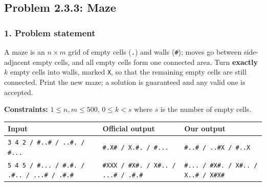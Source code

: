 \subsection{Problem 2.3.3: Maze}


\newcommand{\gtpz}[4]{\node[#3] at (#2*0.65, -#1*0.65) {#4};}

\subsubsection*{1. Problem statement}

A maze is an $n \times m$ grid of empty cells (\texttt{.}) and walls (\texttt{\#}); moves go between side-adjacent empty cells, and all empty cells form one connected area. Turn \textbf{exactly} $k$ empty cells into walls, marked \texttt{X}, so that the remaining empty cells are still connected. Print the new maze; a solution is guaranteed and any valid one is accepted.

\textbf{Constraints:} $1 \le n, m \le 500$, $0 \le k < s$ where $s$ is the number of empty cells.

\begin{table}[H]
\centering\small
\begin{tabular}{@{}p{5.2cm}p{4.3cm}p{4.3cm}@{}}
\toprule
\textbf{Input} & \textbf{Official output} & \textbf{Our output} \\
\midrule
\texttt{3 4 2 / \#..\# / ..\#. / \#...} & \texttt{\#.X\# / X.\#. / \#...} & \texttt{\#..\# / ..\#X / \#..X} \\
\texttt{5 4 5 / \#... / \#.\#. / .\#.. / ...\# / .\#.\#} & \texttt{\#XXX / \#X\#. / X\#.. / ...\# / .\#.\#} & \texttt{\#... / \#X\#. / X\#.. / X..\# / X\#X\#} \\
\bottomrule
\end{tabular}
\end{table}

